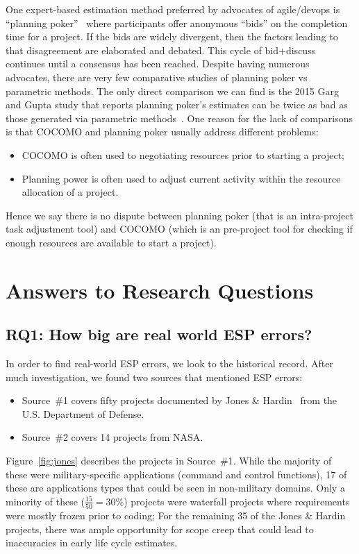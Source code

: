 \documentclass[final,twocolumn]{elsarticle}
\newcommand{\bi}{\begin{itemize}[leftmargin=0.4cm]}
\newcommand{\ei}{\end{itemize}}
\newcommand{\fig}[1]{Figure~\ref{fig:#1}}
\theoremstyle{break}
\begin{document}
 One expert-based estimation method preferred by advocates of
 agile/devops is ``planning poker''~\cite{molokk08}
 where participants offer anonymous ``bids'' on the
 completion time for a project. If the bids are
 widely divergent, then the factors leading to that
 disagreement are elaborated and debated. This cycle
 of bid+discuss continues until a consensus has been
 reached.  Despite having numerous advocates,
 there are very few comparative studies of planning
 poker vs parametric methods. The only direct
 comparison we can find is the 2015 Garg and Gupta
 study that reports planning poker's estimates can be
 twice as bad as those generated via parametric
 methods~\cite{garg15}. One reason for the lack of
 comparisons is that COCOMO and planning poker
 usually address different problems: \bi
\item COCOMO is often used to negotiating resources prior to starting a project;
\item Planning power is often used to adjust current activity within the resource allocation of a project.
  \ei
 Hence we say  there is no dispute between planning poker (that is an intra-project
task adjustment tool) and COCOMO (which is an pre-project tool for checking if enough resources are available
to start a project).
 



\section{Answers to Research Questions}
\subsection{ RQ1: How big are real world ESP errors?}

In order to find real-world ESP errors,  we look to the historical record.
After much investigation, we found two sources that mentioned ESP errors:
\bi
\item Source~\#1 covers fifty projects documented
by Jones \& Hardin~\cite{jones07a} from the U.S.
Department of Defense.
\item Source~\#2 covers 14 projects  from NASA. 
  \ei
  \fig{jones} describes the projects in Source~\#1.
  While the majority of
these were military-specific applications (command
and control functions), 17 of these are applications
types that could be seen in non-military domains.
 Only a minority of
these ($\frac{15}{50}=30\%$) projects were waterfall
projects where requirements were mostly frozen prior
to coding;
  For the remaining 35 of the Jones \& Hardin projects, there was ample opportunity
  for scope creep that could lead to inaccuracies in early life cycle estimates.
\end{document}
